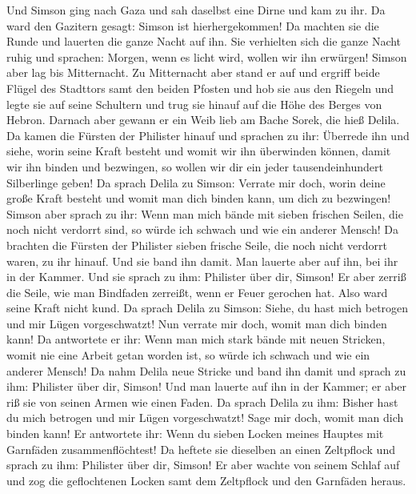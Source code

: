  Und Simson ging nach Gaza und sah daselbst eine Dirne und
kam zu ihr.  Da ward den Gazitern gesagt: Simson ist
hierhergekommen! Da machten sie die Runde und lauerten die ganze Nacht
auf ihn. Sie verhielten sich die ganze Nacht ruhig und sprachen: Morgen,
wenn es licht wird, wollen wir ihn erwürgen!  Simson aber
lag bis Mitternacht. Zu Mitternacht aber stand er auf und ergriff beide
Flügel des Stadttors samt den beiden Pfosten und hob sie aus den Riegeln
und legte sie auf seine Schultern und trug sie hinauf auf die Höhe des
Berges von Hebron.  Darnach aber gewann er ein Weib lieb
am Bache Sorek, die hieß Delila.  Da kamen die Fürsten der
Philister hinauf und sprachen zu ihr: Überrede ihn und siehe, worin
seine Kraft besteht und womit wir ihn überwinden können, damit wir ihn
binden und bezwingen, so wollen wir dir ein jeder tausendeinhundert
Silberlinge geben!  Da sprach Delila zu Simson: Verrate
mir doch, worin deine große Kraft besteht und womit man dich binden
kann, um dich zu bezwingen!  Simson aber sprach zu ihr:
Wenn man mich bände mit sieben frischen Seilen, die noch nicht verdorrt
sind, so würde ich schwach und wie ein anderer Mensch!  Da
brachten die Fürsten der Philister sieben frische Seile, die noch nicht
verdorrt waren, zu ihr hinauf. Und sie band ihn damit. 
Man lauerte aber auf ihn, bei ihr in der Kammer. Und sie sprach zu ihm:
Philister über dir, Simson! Er aber zerriß die Seile, wie man Bindfaden
zerreißt, wenn er Feuer gerochen hat. Also ward seine Kraft nicht kund.
 Da sprach Delila zu Simson: Siehe, du hast mich betrogen
und mir Lügen vorgeschwatzt! Nun verrate mir doch, womit man dich binden
kann!  Da antwortete er ihr: Wenn man mich stark bände
mit neuen Stricken, womit nie eine Arbeit getan worden ist, so würde ich
schwach und wie ein anderer Mensch!  Da nahm Delila neue
Stricke und band ihn damit und sprach zu ihm: Philister über dir,
Simson! Und man lauerte auf ihn in der Kammer; er aber riß sie von
seinen Armen wie einen Faden.  Da sprach Delila zu ihm:
Bisher hast du mich betrogen und mir Lügen vorgeschwatzt! Sage mir doch,
womit man dich binden kann! Er antwortete ihr: Wenn du sieben Locken
meines Hauptes mit Garnfäden zusammenflöchtest!  Da
heftete sie dieselben an einen Zeltpflock und sprach zu ihm: Philister
über dir, Simson! Er aber wachte von seinem Schlaf auf und zog die
geflochtenen Locken samt dem Zeltpflock und den Garnfäden heraus.
